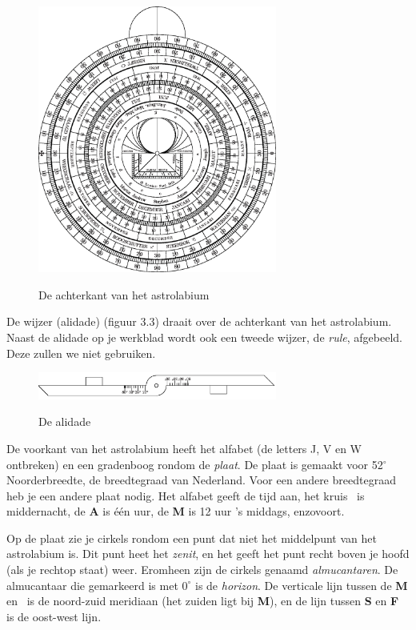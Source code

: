 \begin{figure}
\centering
 \includegraphics[width=0.7\textwidth]{astrolabiumNL/mother_back.eps}
 \label{astrolabe-back}
 \caption{De achterkant van het astrolabium}
\end{figure}

De wijzer (alidade) (figuur 3.3) draait over de achterkant van het astrolabium. Naast de alidade op je werkblad wordt ook een tweede wijzer, de \textit{rule}, afgebeeld. Deze zullen we niet gebruiken.

\begin{figure}
\centering
 \includegraphics[width=0.7\textwidth]{astrolabiumNL/alidade}
 \label{alidade}
 \caption{De alidade}
\end{figure}

De voorkant van het astrolabium heeft het alfabet (de letters J, V en W ontbreken) en een gradenboog rondom de \textit{plaat}. De plaat is gemaakt voor 52$^\circ$ Noorderbreedte, de breedtegraad van Nederland. Voor een andere breedtegraad heb je een andere plaat nodig. Het alfabet geeft de tijd aan, het kruis \kreuz\ is middernacht, de \textbf{A} is \'e\'en uur, de \textbf{M} is 12 uur 's middags, enzovoort.

Op de plaat zie je cirkels rondom een punt dat niet het middelpunt van het astrolabium is. Dit punt heet het \textit{zenit}, en het geeft het punt recht boven je hoofd (als je rechtop staat) weer. Eromheen zijn de cirkels genaamd \textit{almucantaren}. De almucantaar die gemarkeerd is met $0^\circ$ is de \textit{horizon}. De verticale lijn tussen de \textbf{M} en \kreuz\ is de noord-zuid meridiaan (het zuiden ligt bij \textbf{M}), en de lijn tussen \textbf{S} en \textbf{F} is de oost-west lijn.

